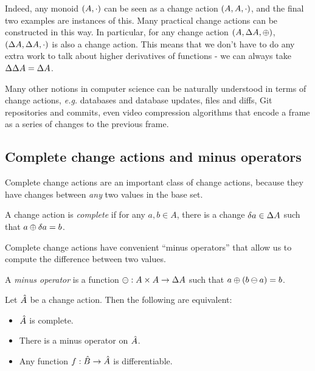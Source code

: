 Indeed, any monoid $(A, \cdot)$ can be seen as a change action
$(A,A,\cdot)$, and the final two examples are instances of this. Many practical change actions
can be constructed in this way. In particular, for any change action $(A,\Delta A,\oplus)$,
$(\Delta A,\Delta A,\cdot)$ is also a change action. This means
that we don't have to do any extra work to talk about higher derivatives of
functions - we can always take $\Delta \Delta A = \Delta A$.

Many other notions in computer science can be naturally understood in terms of change actions, \emph{e.g.} databases
and database updates, files and diffs, Git repositories and commits, even video compression
algorithms that encode a frame as a series of changes to the previous frame.

\subsection{Complete change actions and minus operators}

Complete change actions are an important class of change actions, because they
have changes between \emph{any} two values in the base set.

\begin{defn}
  A change action is \emph{complete} if for any $a, b \in A$, there is
  a change $\delta a \in \Delta A$ such that $a \oplus \delta a = b$.
\end{defn}

Complete change actions have convenient ``minus operators'' that allow us to
compute the difference between two values.

\begin{defn}
  A \emph{minus operator} is a function $\ominus: A \times A \rightarrow \Delta A$ such that $a \oplus (b \ominus a) = b$.
\end{defn}

\begin{prop}
  Let $\hat{A}$ be a change action. Then the following are equivalent:
  \begin{itemize}
    \item $\hat{A}$ is complete.
    \item There is a minus operator on $\hat{A}$.
    \item Any function $f: \hat{B} \rightarrow \hat{A}$ is differentiable.
  \end{itemize}
\end{prop}

